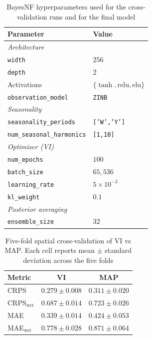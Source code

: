 \begin{table}[ht]
  \centering
  \caption{BayesNF hyperparameters used for the cross-validation runs
  and for the final model}
  \label{tab:bnf-hyperparams}
  \begin{tabular}{l l}
    \toprule
    Parameter                         & Value                                    \\
    \midrule
    \multicolumn{2}{l}{\textit{Architecture}} \\
    \texttt{width}                    & $256$                                    \\
    \texttt{depth}                    & $2$                                      \\
    Activations                       & $\{\tanh, \mathrm{relu}, \mathrm{elu}\}$ \\
    \texttt{observation\_model}       & \texttt{ZINB}                            \\
    \midrule
    \multicolumn{2}{l}{\textit{Seasonality}} \\
    \texttt{seasonality\_periods}     & \texttt{['W','Y']}                       \\
    \texttt{num\_seasonal\_harmonics} & \texttt{[1,10]}                          \\
    \midrule
    \multicolumn{2}{l}{\textit{Optimiser (VI)}} \\
    \texttt{num\_epochs}              & $100$                                    \\
    \texttt{batch\_size}              & $65{,}536$                               \\
    \texttt{learning\_rate}           & $5\times 10^{-3}$                        \\
    \texttt{kl\_weight}               & $0{.}1$                                  \\
    \midrule
    \multicolumn{2}{l}{\textit{Posterior averaging}} \\
    \texttt{ensemble\_size}           & $32$                                     \\
    \bottomrule
  \end{tabular}
\end{table}

\begin{table}[ht]
  \centering
  \caption{Five-fold spatial cross-validation of VI vs MAP. Each cell
  reports mean $\pm$ standard deviation across the five folds}
  \label{tab:bnf-vi-vs-map}
  \begin{tabular}{l c c}
    \toprule
    Metric                & VI                & MAP               \\
    \midrule
    CRPS                  & $0.279 \pm 0.008$ & $0.311 \pm 0.020$ \\
    CRPS$_{\mathrm{wet}}$ & $0.687 \pm 0.014$ & $0.723 \pm 0.026$ \\
    MAE                   & $0.339 \pm 0.014$ & $0.424 \pm 0.053$ \\
    MAE$_{\mathrm{wet}}$  & $0.778 \pm 0.028$ & $0.871 \pm 0.064$ \\
    \bottomrule
  \end{tabular}
\end{table}

